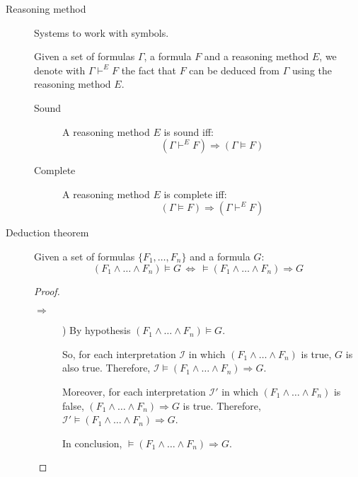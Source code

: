 \begin{description}
    \item[Reasoning method] 
        Systems to work with symbols.
        
        Given a set of formulas $\Gamma$, a formula $F$ and a reasoning method $E$,
        we denote with $\Gamma \vdash^E F$ the fact that $F$ can be deduced from $\Gamma$
        using the reasoning method $E$.

        \begin{description}
            \item[Sound] 
                A reasoning method $E$ is sound iff:
                \[ (\Gamma \vdash^E F) \Rightarrow (\Gamma \models F) \]

            \item[Complete] 
                A reasoning method $E$ is complete iff:
                \[ (\Gamma \models F) \Rightarrow (\Gamma \vdash^E F) \]
        \end{description}

    \item[Deduction theorem] 
        Given a set of formulas $\{ F_1, \dots, F_n \}$ and a formula $G$:
        \[ (F_1 \land \dots \land F_n) \models G \,\iff\, \models (F_1 \land \dots \land F_n) \Rightarrow G \]
        
        \begin{proof} \phantom{}
            \begin{description}
                \item[$\Rightarrow$])
                    By hypothesis $(F_1 \land \dots \land F_n) \models G$.
        
                    So, for each interpretation $\mathcal{I}$ in which $(F_1 \land \dots \land F_n)$ is true, 
                    $G$ is also true.
                    Therefore, $\mathcal{I} \models (F_1 \land \dots \land F_n) \Rightarrow G$.
        
                    Moreover, for each interpretation $\mathcal{I}'$ in which $(F_1 \land \dots \land F_n)$ is false,
                    $(F_1 \land \dots \land F_n) \Rightarrow G$ is true.
                    Therefore, $\mathcal{I}' \models (F_1 \land \dots \land F_n) \Rightarrow G$.
        
                    In conclusion, $\models (F_1 \land \dots \land F_n) \Rightarrow G$.
        

\end{description}
\end{proof}
\end{description}

